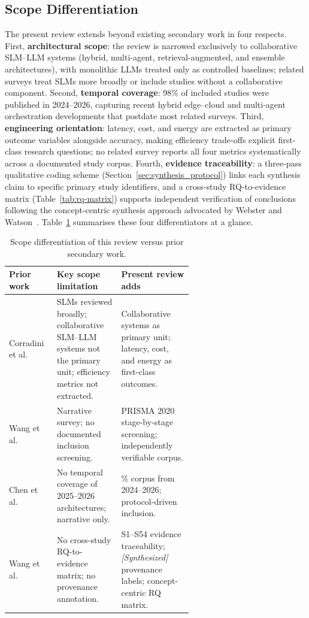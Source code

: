 \subsection{Scope Differentiation}

The present review extends beyond existing secondary work in four respects. First, \textbf{architectural scope}: the review is narrowed exclusively to collaborative SLM--LLM systems (hybrid, multi-agent, retrieval-augmented, and ensemble architectures), with monolithic LLMs treated only as controlled baselines; related surveys treat SLMs more broadly or include studies without a collaborative component. Second, \textbf{temporal coverage}: 98\% of included studies were published in 2024--2026, capturing recent hybrid edge--cloud and multi-agent orchestration developments that postdate most related surveys. Third, \textbf{engineering orientation}: latency, cost, and energy are extracted as primary outcome variables alongside accuracy, making efficiency trade-offs explicit first-class research questions; no related survey reports all four metrics systematically across a documented study corpus. Fourth, \textbf{evidence traceability}: a three-pass qualitative coding scheme (Section~\ref{sec:synthesis_protocol}) links each synthesis claim to specific primary study identifiers, and a cross-study RQ-to-evidence matrix (Table~\ref{tab:rq-matrix}) supports independent verification of conclusions following the concept-centric synthesis approach advocated by Webster and Watson~\cite{webstonwatson2002}. Table~\ref{tab:scope-diff} summarises these four differentiators at a glance.

{\footnotesize
\setlength{\tabcolsep}{3pt}
\renewcommand{\arraystretch}{1.05}
\begin{table}[!htbp]
\centering
\caption{Scope differentiation of this review versus prior secondary work.}
\label{tab:scope-diff}
\begin{tabularx}{\linewidth}{@{} >{\raggedright\arraybackslash}p{0.26\linewidth} >{\raggedright\arraybackslash}p{0.35\linewidth} >{\raggedright\arraybackslash}X @{}}
\toprule
\textbf{Prior work} & \textbf{Key scope limitation} & \textbf{Present review adds} \\
\midrule
Corradini et al.~\cite{slmreview2025prisma} &
SLMs reviewed broadly; collaborative SLM--LLM systems not the primary unit; efficiency metrics not extracted. &
Collaborative systems as primary unit; latency, cost, and energy as first-class outcomes. \\
Wang et al.~\cite{wang2024slmsurvey} &
Narrative survey; no documented inclusion screening. &
PRISMA 2020 stage-by-stage screening; independently verifiable corpus. \\
Chen et al.~\cite{chen2025collabmech} &
No temporal coverage of 2025--2026 architectures; narrative only. &
98\% corpus from 2024--2026; protocol-driven inclusion. \\
Wang et al.~\cite{wang2025collabperf} &
No cross-study RQ-to-evidence matrix; no provenance annotation. &
S1--S54 evidence traceability; \textit{[Synthesized]} provenance labels; concept-centric RQ matrix. \\
\bottomrule
\end{tabularx}
\end{table}
}
